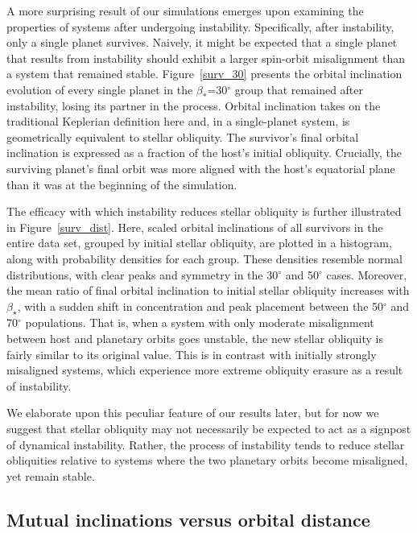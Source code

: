 \documentclass[twocolumn]{aastex63}
\begin{document}
A more surprising result of our simulations emerges upon examining the properties of systems after undergoing instability. Specifically, after instability, only a single planet survives. Naively, it might be expected that a single planet that results from instability should exhibit a larger spin-orbit misalignment than a system that remained stable. Figure~\ref{surv_30} presents the orbital inclination evolution of every single planet in the \(\beta_*\)=30$^{\circ}$ group that remained after instability, losing its partner in the process. Orbital inclination takes on the traditional Keplerian definition here and, in a single-planet system, is geometrically equivalent to stellar obliquity. The survivor’s final orbital inclination is expressed as a fraction of the host’s initial obliquity. Crucially, the surviving planet's final orbit was more aligned with the host’s equatorial plane than it was at the beginning of the simulation. 

The efficacy with which instability reduces stellar obliquity is further illustrated in Figure~\ref{surv_dist}. Here, scaled orbital inclinations of all survivors in the entire data set, grouped by initial stellar obliquity, are plotted in a histogram, along with probability densities for each group. These densities resemble normal distributions, with clear peaks and symmetry in the 30$^{\circ}$ and 50$^{\circ}$ cases. Moreover, the mean ratio of final orbital inclination to initial stellar obliquity increases with \(\beta_\star\), with a sudden shift in concentration and peak placement between the 50$^{\circ}$ and 70$^{\circ}$ populations. That is,  when a system with only moderate misalignment between host and planetary orbits goes unstable, the new stellar obliquity is fairly similar to its original value. This is in contrast with initially strongly misaligned systems, which experience more extreme obliquity erasure as a result of instability.

We elaborate upon this peculiar feature of our results later, but for now we suggest that stellar obliquity may not necessarily be expected to act as a signpost of dynamical instability. Rather, the process of instability tends to reduce stellar obliquities relative to systems where the two planetary orbits become misaligned, yet remain stable.

\subsection{Mutual inclinations versus orbital distance}
\end{document}
